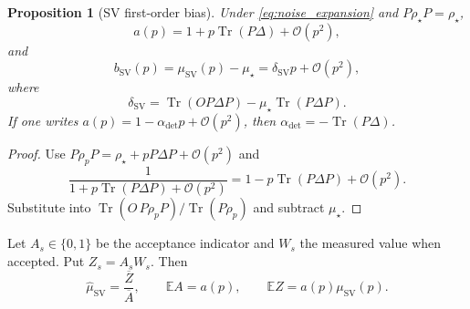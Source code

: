 \documentclass[11pt]{article}
\newtheorem{proposition}{Proposition}
\DeclareMathOperator{\Tr}{Tr}
\newcommand{\E}{\mathbb{E}}
\newcommand{\1}{\mathbf{1}}
\newcommand{\OO}{\mathcal{O}}
\begin{document}
\begin{proposition}[SV first-order bias]
\label{prop:sv_delta_precise}
Under \cref{eq:noise_expansion} and \(P\rho_\star P=\rho_\star\),
\begin{equation}
    a(p)=1+p\Tr(P\Delta)+\OO(p^2),
\end{equation}
and
\begin{equation}
    b_{\mathrm{SV}}(p)=\mu_{\mathrm{SV}}(p)-\mu_\star
    =\delta_{\mathrm{SV}}p+\OO(p^2),
\end{equation}
where
\begin{equation}
    \delta_{\mathrm{SV}}
    =\Tr(OP\Delta P)-\mu_\star\Tr(P\Delta P).
    \label{eq:delta_sv_precise}
\end{equation}
If one writes \(a(p)=1-\alpha_{\mathrm{det}}p+\OO(p^2)\), then \(\alpha_{\mathrm{det}}=-\Tr(P\Delta)\).
\end{proposition}

\begin{proof}
Use \(P\rho_pP=\rho_\star+pP\Delta P+\OO(p^2)\) and
\begin{equation}
    \frac{1}{1+p\Tr(P\Delta P)+\OO(p^2)}
    =1-p\Tr(P\Delta P)+\OO(p^2).
\end{equation}
Substitute into \(\Tr(O\,P\rho_pP)/\Tr(P\rho_p)\) and subtract \(\mu_\star\).
\end{proof}

Let \(A_s\in\{0,1\}\) be the acceptance indicator and \(W_s\) the measured value when accepted.  Put \(Z_s=A_sW_s\).  Then
\begin{equation}
    \widehat\mu_{\mathrm{SV}}=\frac{\overline Z}{\overline A},
    \qquad
    \E A=a(p),
    \qquad
    \E Z=a(p)\mu_{\mathrm{SV}}(p).
\end{equation}
\end{document}
